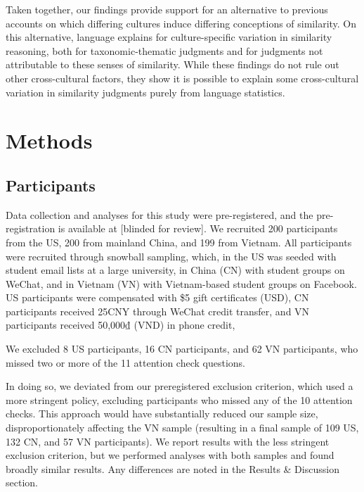 \documentclass[10pt, letterpaper]{article}
\begin{document}
Taken together, our findings provide support for an alternative to
previous accounts on which differing cultures induce differing
conceptions of similarity. On this alternative, language explains for
culture-specific variation in similarity reasoning, both for
taxonomic-thematic judgments and for judgments not attributable to these
senses of similarity. While these findings do not rule out other
cross-cultural factors, they show it is possible to explain some
cross-cultural variation in similarity judgments purely from language
statistics.

\hypertarget{methods}{%
\section{Methods}\label{methods}}

\hypertarget{participants}{%
\subsection{Participants}\label{participants}}

Data collection and analyses for this study were pre-registered, and the
pre-registration is available at {[}blinded for review{]}. We recruited
200 participants from the US, 200 from mainland China, and 199 from
Vietnam. All participants were recruited through snowball sampling,
which, in the US was seeded with student email lists at a large
university, in China (CN) with student groups on WeChat, and in Vietnam
(VN) with Vietnam-based student groups on Facebook. US participants were
compensated with \$5 gift certificates (USD), CN participants received
25CNY through WeChat credit transfer, and VN participants received
50,000₫ (VND) in phone credit,

We excluded 8 US participants, 16 CN participants, and 62 VN
participants, who missed two or more of the 11 attention check
questions.

In doing so, we deviated from our preregistered exclusion criterion,
which used a more stringent policy, excluding participants who missed
any of the 10 attention checks. This approach would have substantially
reduced our sample size, disproportionately affecting the VN sample
(resulting in a final sample of 109 US, 132 CN, and 57 VN participants).
We report results with the less stringent exclusion criterion, but we
performed analyses with both samples and found broadly similar results.
Any differences are noted in the Results \& Discussion section.
\end{document}
